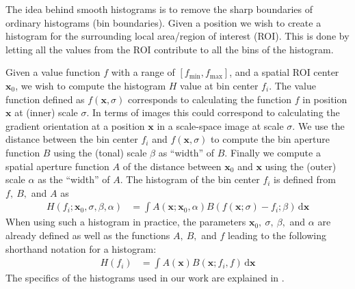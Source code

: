\documentclass[thesis.tex]{subfiles}
\def\x{\mathbf{x}}
\begin{document}
The idea behind smooth histograms is to remove the sharp boundaries of ordinary histograms (bin boundaries). Given a position we wish to create a histogram for the surrounding local area/region of interest (ROI). This is done by letting all the values from the ROI contribute to all the bins of the histogram.

Given a value function $f$ with a range of $[f_\text{min},f_\text{max}]$, and a spatial ROI center $\x_0$, we wish to compute the histogram $H$ value at bin center $f_i$.
The value function defined as $f(\x,\sigma)$ corresponds to calculating the function $f$ in position $\x$ at (inner) scale $\sigma$. In terms of images this could correspond to calculating the gradient orientation at a position $\x$ in a scale-space image at scale $\sigma$.
We use the distance between the bin center $f_i$ and $f(\x,\sigma)$ to compute the bin aperture function $B$ using the (tonal) scale $\beta$ as ``width'' of $B$. Finally we compute a spatial aperture function $A$ of the distance between $\x_0$ and $\x$ using the (outer) scale $\alpha$ as the ``width'' of $A$. The histogram of the bin center $f_i$ is defined from $f,~B,$ and $A$ as
%
\begin{align}
	\label{eq:histogramLong}
	H(f_i;\x_0,\sigma,\beta,\alpha) &= \int A(\x;\x_0,\alpha) B(f(\x;\sigma)-f_i;\beta)\,\text{d}\x
\end{align}
%
When using such a histogram in practice, the parameters $\x_0,~\sigma,~\beta,$ and $\alpha$ are already defined as well as the functions $A,~B,$ and $f$ leading to the following shorthand notation for a histogram:
%
\begin{align}
	\label{eq:histogramShort}
	H(f_i) &= \int A(\x) B(\x;f_i,f)\,\text{d}\x
\end{align}
%
The specifics of the histograms used in our work are explained in .
%
\end{document}
